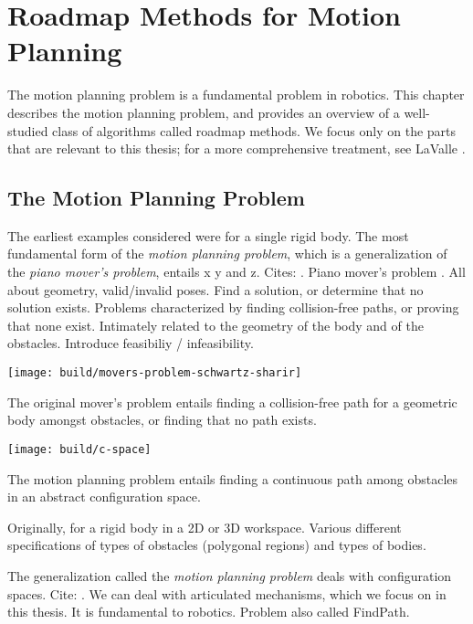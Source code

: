 \chapter{Roadmap Methods for Motion Planning}
\label{chap:roadmaps}

The motion planning problem is a fundamental problem in robotics.
This chapter describes the motion planning problem,
and provides an overview of a well-studied class of algorithms called
roadmap methods.
We focus only on the parts that are relevant to this thesis;
for a more comprehensive treatment,
see LaValle \citep{lavalle2006planningbook}.

\section{The Motion Planning Problem}

The earliest examples considered were for a single rigid body.
The most fundamental form of the \emph{motion planning problem},
which is a generalization of the \emph{piano mover's problem},
entails x y and z.
Cites:
\citep{lozanoperezwedley1979collisionfree}.
Piano mover's problem
\citep{schwartzsharir1983pianomovers1}.
All about geometry, valid/invalid poses.
Find a solution, or determine that no solution exists.
Problems characterized by finding collision-free paths,
or proving that none exist.
Intimately related to the geometry of the body and of the obstacles.
Introduce feasibiliy / infeasibility.

\begin{marginfigure}
   \centering
   \texttt{[image: build/movers-problem-schwartz-sharir]} %
   \caption{The original mover's problem
      \citep{schwartzsharir1983pianomovers1}
      entails finding a collision-free path for a geometric body
      amongst obstacles,
      or finding that no path exists.}
\end{marginfigure}

\begin{marginfigure}
   \centering
   \texttt{[image: build/c-space]} %
   \caption{The motion planning problem entails finding a continuous
      path among obstacles in an abstract configuration space.}
\end{marginfigure}

Originally, for a rigid body
in a 2D or 3D workspace.
Various different specifications of types of obstacles (polygonal regions)
and types of bodies.

The generalization called the \emph{motion planning problem}
deals with configuration spaces.
Cite: \citep{lozanoperez1983cspace}.
We can deal with articulated mechanisms,
which we focus on in this thesis.
It is fundamental to robotics.
Problem also called FindPath.

